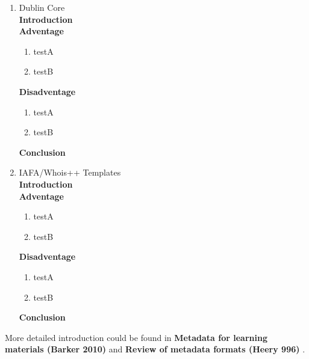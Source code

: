\documentclass[a4paper]{article}
\begin{document}
\begin{enumerate}
	\item Dublin Core\\
	{\bf Introduction}\\
	
	{\bf Adventage}
	\begin{enumerate}
		\item testA
		\item testB
	\end{enumerate}	
	{\bf Disadventage}
	\begin{enumerate}
		\item testA
		\item testB
	\end{enumerate}
	{\bf Conclusion}\\
	
	\item IAFA/Whois++ Templates\\
	{\bf Introduction}\\
	
	{\bf Adventage}
	\begin{enumerate}
		\item testA
		\item testB
	\end{enumerate}	
	{\bf Disadventage}
	\begin{enumerate}
		\item testA
		\item testB
	\end{enumerate}
	{\bf Conclusion}\\	
	
\end{enumerate}

More detailed introduction could be found in {\bf Metadata for learning materials (Barker 2010)} \cite{barker2010metadata} and {\bf Review of metadata formats (Heery 996)} \cite{heery1996review}.

\end{document}
